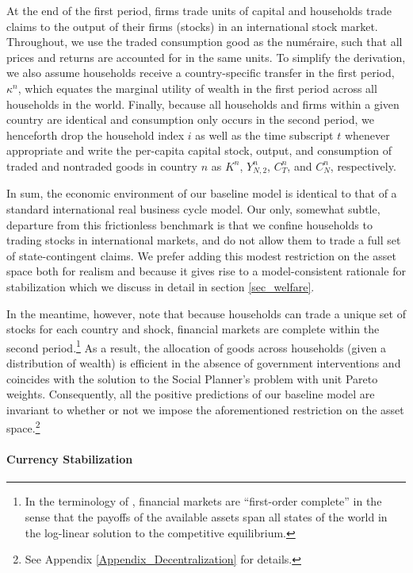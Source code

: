 \documentclass[12pt,letter]{article}
\theoremstyle{break} \theorembodyfont{\normalfont\itshape}
\theoremstyle{break}
\theoremstyle{break} \theorembodyfont{\normalfont\itshape}
\theoremstyle{break} \theorembodyfont{\normalfont\itshape}
\begin{document}
At the end of the first period, firms trade units of capital and
households trade claims to the output of their firms (stocks) in an
international stock market. Throughout, we use the traded consumption
good as the num\'{e}raire, such that all prices and returns are
accounted for in the same units. To simplify the derivation, we also
assume households receive a country-specific transfer in the first
period, $\kappa^n$, which equates the marginal utility of wealth in
the first period across all households in the world. Finally, because
all households and firms within a given country are identical and
consumption only occurs in the second period, we henceforth drop the
household index \(i\) as well as the time subscript $t$ whenever
appropriate and write the per-capita capital stock, output, and
consumption of traded and nontraded goods in country \(n\) as
\(K^{n}\), \(Y_{N,2}^n\), $C_T^n$, and $C_N^n$, respectively.

In sum, the economic environment of our baseline model is identical to
that of a standard international real business cycle model. Our only,
somewhat subtle, departure from this frictionless benchmark is that we
confine households to trading stocks in international markets, and do
not allow them to trade a full set of state-contingent claims. We
prefer adding this modest restriction on the asset space both for
realism and because it gives rise to a model-consistent rationale for
stabilization which we discuss in detail in section \ref{sec_welfare}.

In the meantime, however, note that because households can trade a
unique set of stocks for each country and shock, financial markets are
complete within the second period.\footnote{In the terminology of
  \citep{Coeurdacier2013}, financial markets are ``first-order
  complete'' in the sense that the payoffs of the available assets
  span all states of the world in the log-linear solution to the
  competitive equilibrium.} As a result, the allocation of goods
across households (given a distribution of wealth) is efficient in the
absence of government interventions and coincides with the solution to
the Social Planner's problem with unit Pareto weights. Consequently,
all the positive predictions of our baseline model are invariant to
whether or not we impose the aforementioned restriction on the asset
space.\footnote{See Appendix \ref{Appendix_Decentralization} for
  details.}


\paragraph{Currency Stabilization}
\end{document}
